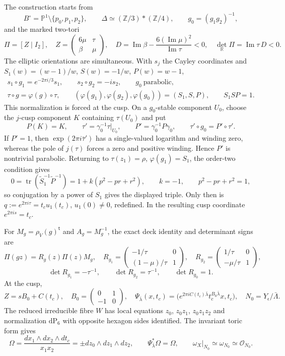 \documentclass[10pt,letterpaper]{article}
\begin{document}
The construction starts from
\[
 B^\circ=\mathbb P^1\setminus\{p_0,p_1,p_2\},\qquad
 \Delta\simeq(\mathbb Z/3)*(\mathbb Z/4),\qquad g_0=(g_1g_2)^{-1},
\]
and the marked two-tori
\[
 \Pi=[Z\mid I_2],\quad
 Z=\begin{pmatrix}6\mu&\tau\\ \beta&\mu\end{pmatrix},\quad
 D=\operatorname{Im}\beta-
 \frac{6(\operatorname{Im}\mu)^2}{\operatorname{Im}\tau}<0,\quad
 \det_{\mathbb R}\Pi=\operatorname{Im}\tau\,D<0.
\]
The elliptic orientations are simultaneous.  With $s_j$ the Cayley
coordinates and
$S_1(w)=(w-1)/w$, $S(w)=-1/w$, $P(w)=w-1$,
\[
 \begin{gathered}
 s_1\circ g_1=e^{-2\pi i/3}s_1,\qquad
 s_2\circ g_2=-is_2,\qquad g_0\ \text{parabolic},\\
 \tau\circ g=\varphi(g)\circ\tau,\qquad
 (\varphi(g_1),\varphi(g_2),\varphi(g_0))=(S_1,S,P),\qquad S_1SP=1.
 \end{gathered}
\]
This normalization is forced at the cusp.  On a $g_0$-stable component
$U_0$, choose the $j$-cusp component $K$ containing $\tau(U_0)$ and put
\[
 P(K)=K,\qquad
 \tau'=\gamma_0^{-1}\tau|_{U_0},\qquad
 P'=\gamma_0^{-1}P\gamma_0,\qquad \tau'\circ g_0=P'\circ\tau'.
\]
If $P'=1$, then $\exp(2\pi i\bar\tau')$ has a single-valued logarithm and
winding zero, whereas the pole of $j(\tau)$ forces a zero and positive
winding.  Hence $P'$ is nontrivial parabolic.  Returning to
$\tau(z_1)=\rho$, $\varphi(g_1)=S_1$, the order-two condition gives
\[
 0=\operatorname{tr}(\widetilde S_1^{-1}\widetilde P^{-1})
 =1+k(p^2-pr+r^2),\qquad k=-1,\qquad p^2-pr+r^2=1,
\]
so conjugation by a power of $S_1$ gives the displayed triple.  Only then
is $q:=e^{2\pi i\tau}=t_cu_1(t_c)$, $u_1(0)\ne0$, redefined.  In the
resulting cusp coordinate $e^{2\pi is}=t_c$.

For $M_g=\rho_V(g)^{\mathsf t}$ and $A_g=M_g^{-1}$, the exact deck identity
and determinant signs are
\[
 \Pi(gz)=R_g(z)\Pi(z)M_g,\quad
 R_{g_1}=\begin{pmatrix}-1/\tau&0\\(1-\mu)/\tau&1\end{pmatrix},\quad
 R_{g_2}=\begin{pmatrix}1/\tau&0\\-\mu/\tau&1\end{pmatrix},
\]
\[
 \det R_{g_1}=-\tau^{-1},\qquad
 \det R_{g_2}=\tau^{-1},\qquad \det R_{g_0}=1.
\]
At the cusp,
\[
 Z=sB_0+C(t_c),\quad B_0=\begin{pmatrix}0&1\\-1&0\end{pmatrix},\quad
 \Psi_{\bar\lambda}(x,t_c)=
 \bigl(e^{2\pi iC(t_c)\bar\lambda}t_c^{B_0\bar\lambda}x,t_c\bigr),\quad
 N_0=Y_\epsilon/\bar\Lambda.
\]
The reduced irreducible fibre $W$ has local equations
$z_0$, $z_0z_1$, $z_0z_1z_2$ and normalization $\mathrm{dP}_6$ with
opposite hexagon sides identified.  The invariant toric form gives
\[
 \Omega=\frac{dx_1\wedge dx_2\wedge dt_c}{x_1x_2}
 =\pm dz_0\wedge dz_1\wedge dz_2,\qquad
 \Psi_{\bar\lambda}^*\Omega=\Omega,\qquad
 \omega_X|_{N_0}\simeq\omega_{N_0}\simeq\mathcal O_{N_0}.
\]
\end{document}
